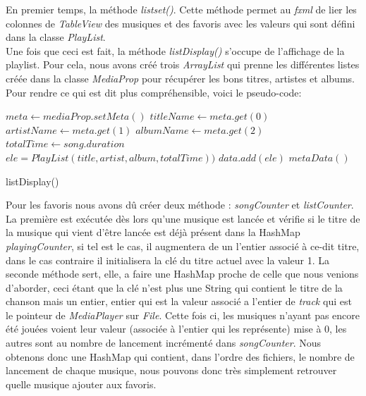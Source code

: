 \documentclass[a4paper,12pt]{report} %
\begin{document}
	En premier temps, la méthode \textit{listset()}. Cette méthode permet au \textit{fxml} de lier les colonnes de \textit{TableView} des musiques et des favoris avec les valeurs qui sont défini dans la classe \textit{PlayList}.\\
Une fois que ceci est fait, la méthode \textit{listDisplay()} s'occupe de l'affichage de la playlist. Pour cela, nous avons créé trois \textit{ArrayList} qui prenne les différentes listes créée dans la classe \textit{MediaProp} pour récupérer les bons titres, artistes et albums. Pour rendre ce qui est dit plus compréhensible, voici le pseudo-code:

	\begin{algorithm}
		\DontPrintSemicolon
		$meta \gets mediaProp.setMeta()$ 
		$titleName \gets meta.get(0)$ 
		$artistName \gets meta.get(1)$ 
		$albumName \gets meta.get(2)$ 
		 {
  			$totalTime \gets song.duration$\\
  			$ele = PlayList(title, artist, album, totalTime))$ 
  			$data.add(ele)$ 
		}
		$metaData()$ 
		\caption{listDisplay()}
	\end{algorithm}

	Pour les favoris nous avons dû créer deux méthode : \textit{songCounter} et \textit{listCounter}. La première est exécutée dès lors qu'une musique est lancée et vérifie si le  titre de la musique qui vient d'être lancée est déjà présent dans la HashMap \textit{playingCounter}, si tel est le cas, il augmentera de un l'entier associé à ce-dit titre, dans le cas contraire il initialisera la clé du titre actuel avec la valeur 1. La seconde méthode sert, elle, a faire une HashMap proche de celle que nous venions d'aborder, ceci étant que la clé n'est plus une String qui contient le titre de la chanson mais un entier, entier qui est la valeur associé a l'entier de \textit{track} qui est le pointeur de \textit{MediaPlayer} sur \textit{File}. Cette fois ci, les musiques n'ayant pas encore été jouées voient leur valeur (associée à l'entier qui les représente) mise à 0, les autres sont au nombre de lancement incrémenté dans \textit{songCounter}. Nous obtenons donc une HashMap qui contient, dans l'ordre des fichiers, le nombre de lancement de chaque musique, nous pouvons donc très simplement retrouver quelle musique ajouter aux favoris.\\
	
\end{document}
